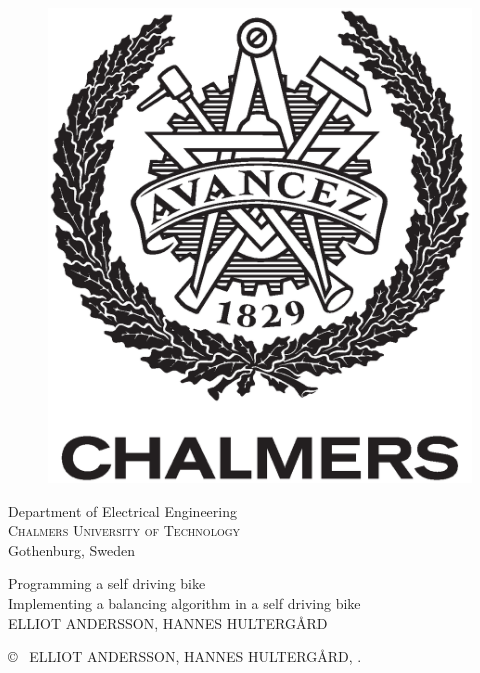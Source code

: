 \begin{center}
\begin{figure}[H]
    \includegraphics[width=0.2\pdfpagewidth]{figure/auxiliary/AvancezChalmers_black_centered.eps} \\
    \fi
	\end{figure}	\vspace{5mm}	
	
    Department of Electrical Engineering \\
	\textsc{Chalmers University of Technology} \\
	Gothenburg, Sweden \the\year \\
\end{center}


\newpage
\thispagestyle{plain}
\vspace*{4.5cm}
Programming a self driving bike\\
Implementing a balancing algorithm in a self driving bike\\
ELLIOT ANDERSSON, HANNES HULTERGÅRD \setlength{\parskip}{1cm}

\copyright ~ ELLIOT ANDERSSON, HANNES HULTERGÅRD, \the\year. \setlength{\parskip}{1cm}

